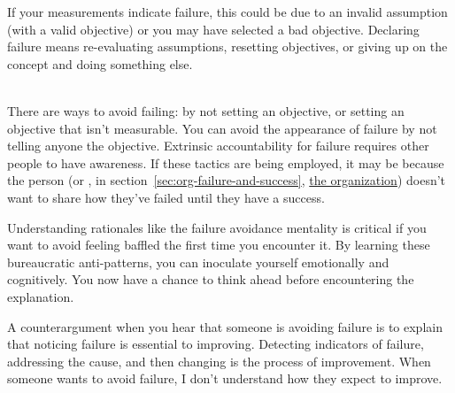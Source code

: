 If your measurements indicate failure, this could be due to an invalid assumption (with a valid objective) or you may have selected a bad objective. Declaring failure means re-evaluating assumptions, resetting objectives, or giving up on the concept and doing something else.

\ \\

There are ways to avoid failing: by not setting an objective, or setting an objective that isn't measurable. You can avoid the appearance of failure by not telling anyone the objective. Extrinsic accountability for failure requires other people to have awareness. If these tactics are being employed, it may be because the person (or
\ifsectionref
, in section~\ref{sec:org-failure-and-success}, 
\fi
\hyperref[sec:org-failure-and-success]{the organization}) doesn't want to share how they've failed until they have a success. 

Understanding rationales like the failure avoidance mentality is critical if you want to avoid feeling baffled the first time you encounter it. By learning these bureaucratic anti-patterns, you can inoculate yourself emotionally and cognitively. You now have a chance to think ahead before encountering the explanation.

A counterargument when you hear that someone is avoiding failure is to explain that noticing failure is essential to improving. Detecting indicators of failure, addressing the cause, and then changing is the process of improvement. When someone wants to avoid failure, I don't understand how they expect to improve. 

